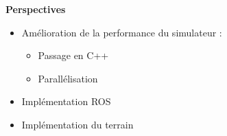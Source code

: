 \documentclass[aspectratio=169,10pt]{beamer}
\begin{document}
\begin{frame}{\textbf{Perspectives}}
	\begin{itemize}
		\item Amélioration de la performance du simulateur :
		\begin{itemize}
			\item Passage en C++
			\item Parallélisation
		\end{itemize}
		\vspace{0.2cm}
		\item Implémentation ROS
		\vspace{0.2cm}
		\item Implémentation du terrain
	\end{itemize}


\end{frame}
\end{document}
